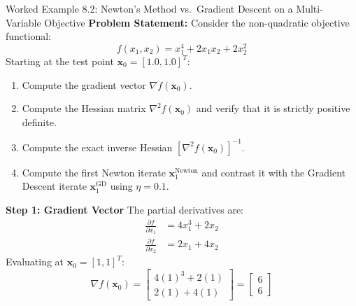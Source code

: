 \begin{examplebox}[breakable]{Worked Example 8.2: Newton's Method vs.\ Gradient Descent on a Multi-Variable Objective}
\textbf{Problem Statement:}
Consider the non-quadratic objective functional:
\begin{equation}
f(x_1, x_2) = x_1^4 + 2x_1 x_2 + 2x_2^2
\end{equation}
Starting at the test point $\mathbf{x}_0 = [1.0, 1.0]^T$:
\begin{enumerate}
    \item Compute the gradient vector $\nabla f(\mathbf{x}_0)$.
    \item Compute the Hessian matrix $\nabla^2 f(\mathbf{x}_0)$ and verify that it is strictly positive definite.
    \item Compute the exact inverse Hessian $[\nabla^2 f(\mathbf{x}_0)]^{-1}$.
    \item Compute the first Newton iterate $\mathbf{x}_1^{\text{Newton}}$ and contrast it with the Gradient Descent iterate $\mathbf{x}_1^{\text{GD}}$ using $\eta = 0.1$.
\end{enumerate}

\tcblower

\textbf{Step 1: Gradient Vector}
The partial derivatives are:
\begin{align}
\frac{\partial f}{\partial x_1} &= 4x_1^3 + 2x_2 \\
\frac{\partial f}{\partial x_2} &= 2x_1 + 4x_2
\end{align}
Evaluating at $\mathbf{x}_0 = [1, 1]^T$:
\begin{equation}
\nabla f(\mathbf{x}_0) = \begin{bmatrix} 4(1)^3 + 2(1) \\ 2(1) + 4(1) \end{bmatrix} = \begin{bmatrix} 6 \\ 6 \end{bmatrix}
\end{equation}


\end{examplebox}

